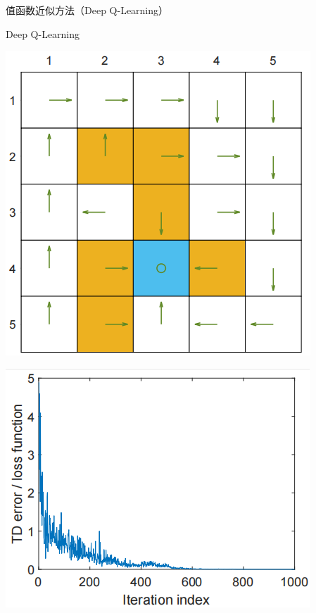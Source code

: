 \begin{section}{值函数近似方法\alert{（Deep Q-Learning）}}
\begin{frame}{Deep Q-Learning}
\begin{center}
\begin{minipage}{0.18\textwidth}
        \end{minipage}
        \hspace{1cm}
        \begin{minipage}{0.18\textwidth}
            \centering
            \includegraphics[width=\linewidth]{assets/DQN1000policy.png}
        \end{minipage}
    \end{center}
    \begin{center}
        \begin{minipage}{0.22\textwidth}
            \centering
            \includegraphics[width=\linewidth]{assets/DQN1000TDerror.png}

\end{minipage}
\end{center}
\end{frame}
\end{section}
